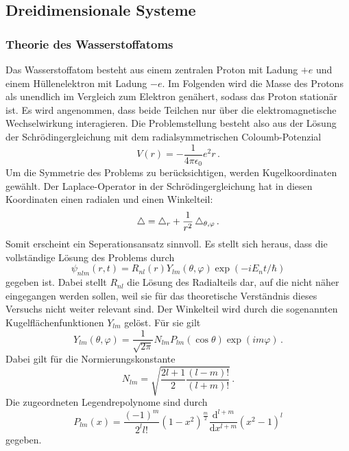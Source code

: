 \subsection{Dreidimensionale Systeme}
\label{subsec:dreidimsyst}

\subsubsection{Theorie des Wasserstoffatoms}
\label{subsubsec:hatom}
Das Wasserstoffatom besteht aus einem zentralen Proton mit Ladung $+e$ und einem Hüllenelektron mit Ladung $-e$. Im Folgenden wird die Masse des Protons als unendlich im Vergleich zum Elektron genähert, sodass das Proton stationär ist. Es wird angenommen, dass beide Teilchen nur über die elektromagnetische Wechselwirkung interagieren. Die Problemstellung besteht also aus der Lösung der Schrödingergleichung mit dem radialsymmetrischen Coloumb-Potenzial
\begin{equation}
  V(r) = - \frac{1}{4 \pi \epsilon_0}{e^2}{r}\,.
  \label{eqn:coloumb}
\end{equation}
Um die Symmetrie des Problems zu berücksichtigen, werden Kugelkoordinaten gewählt. Der Laplace-Operator in der Schrödingergleichung hat in diesen Koordinaten einen radialen und einen Winkelteil:
\begin{equation}
  \mathop{}\!\mathbin\bigtriangleup = \mathop{}\!\mathbin\bigtriangleup_r + \frac{1}{r^2} \mathop{}\!\mathbin\bigtriangleup_{\theta, \varphi}\,.
  \label{eqn:laplaceWinkel}
\end{equation}
Somit erscheint ein Seperationsansatz sinnvoll. Es stellt sich heraus, dass die vollständige Lösung des Problems durch
\begin{equation}
  \psi_{nlm}(r,t) = R_{nl}(r) Y_{lm}(\theta, \varphi) \exp(-i E_n t / \hbar)
  \label{eqn:hatomloesung}
\end{equation}
gegeben ist. Dabei stellt $R_{nl}$ die Lösung des Radialteils dar, auf die nicht näher eingegangen werden sollen, weil sie für das theoretische Verständnis dieses Versuchs nicht weiter relevant sind. Der Winkelteil wird durch die sogenannten Kugelflächenfunktionen $Y_{lm}$ gelöst. Für sie gilt
\begin{equation}
  Y_{lm}(\theta,\varphi) = \frac{1}{\sqrt{2\pi}} N_{lm} P_{lm}(\cos\theta) \exp(im\varphi)\,.
  \label{eqn:kugelflaechenfunktionen}
\end{equation}
Dabei gilt für die Normierungskonstante
\begin{equation}
  N_{lm} = \sqrt{\frac{2l+1}{2} \frac{(l-m)!}{(l+m)!}}\,.
  \label{eqn:ylmnormierung}
\end{equation}
Die zugeordneten Legendrepolynome sind durch
\begin{equation}
  P_{lm}(x) = \frac{(-1)^m}{2^l l!} (1-x^2)^{\frac{m}{2}} \frac{\mathrm{d}^{l+m}}{\mathrm{d}x^{l+m}} (x^2-1)^l
  \label{eqn:zugeordneteLegendrepolynome}
\end{equation}
gegeben.

